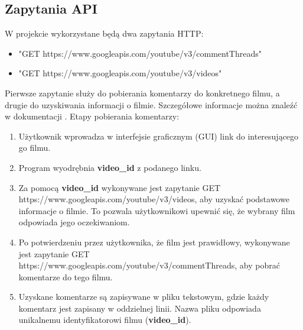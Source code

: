 	\subsection{Zapytania API}
		W projekcie wykorzystane będą dwa zapytania HTTP:
		\begin{itemize}
			\item "GET https://www.googleapis.com/youtube/v3/commentThreads"
			\item "GET https://www.googleapis.com/youtube/v3/videos"
		\end{itemize}
	 	Pierwsze zapytanie służy do pobierania komentarzy do konkretnego filmu, a drugie do uzyskiwania informacji o filmie. Szczegółowe informacje można znaleźć w dokumentacji \cite{YouTubeAPI}. Etapy pobierania komentarzy:
	 	\begin{enumerate}
	 		\item Użytkownik wprowadza w interfejsie graficznym (GUI) link do interesującego go filmu.
	 		\item Program wyodrębnia \textbf{video\_id} z podanego linku.
	 		\item Za pomocą \textbf{video\_id} wykonywane jest zapytanie GET https://www.googleapis.com/youtube/v3/videos, aby uzyskać podstawowe informacje o filmie. To pozwala użytkownikowi upewnić się, że wybrany film odpowiada jego oczekiwaniom.
	 		\item Po potwierdzeniu przez użytkownika, że film jest prawidłowy, wykonywane jest zapytanie GET https://www.googleapis.com/youtube/v3/commentThreads, aby pobrać komentarze do tego filmu.
	 		\item Uzyskane komentarze są zapisywane w pliku tekstowym, gdzie każdy komentarz jest zapisany w oddzielnej linii. Nazwa pliku odpowiada unikalnemu identyfikatorowi filmu (\textbf{video\_id}).
	 	\end{enumerate}
	

